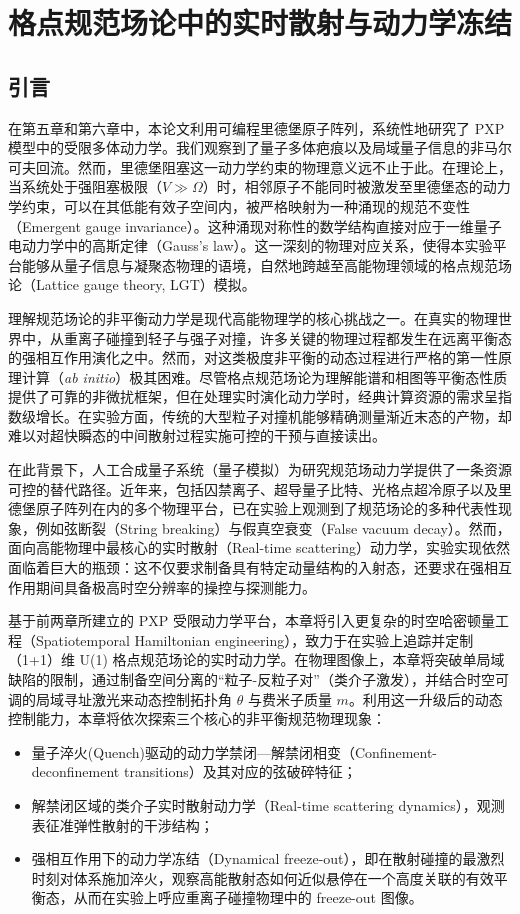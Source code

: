 \documentclass[../main.tex]{subfiles}
\begin{document}
\chapter{格点规范场论中的实时散射与动力学冻结}



\section{引言}

在第五章和第六章中，本论文利用可编程里德堡原子阵列，系统性地研究了 PXP 模型中的受限多体动力学。我们观察到了量子多体疤痕以及局域量子信息的非马尔可夫回流。然而，里德堡阻塞这一动力学约束的物理意义远不止于此。在理论上，当系统处于强阻塞极限（$V\gg\Omega$）时，相邻原子不能同时被激发至里德堡态的动力学约束，可以在其低能有效子空间内，被严格映射为一种涌现的规范不变性（Emergent gauge invariance）。这种涌现对称性的数学结构直接对应于一维量子电动力学中的高斯定律（Gauss's law）。这一深刻的物理对应关系，使得本实验平台能够从量子信息与凝聚态物理的语境，自然地跨越至高能物理领域的格点规范场论（Lattice gauge theory, LGT）模拟。

理解规范场论的非平衡动力学是现代高能物理学的核心挑战之一。在真实的物理世界中，从重离子碰撞到轻子与强子对撞，许多关键的物理过程都发生在远离平衡态的强相互作用演化之中。然而，对这类极度非平衡的动态过程进行严格的第一性原理计算（\textit{ab initio}）极其困难。尽管格点规范场论为理解能谱和相图等平衡态性质提供了可靠的非微扰框架，但在处理实时演化动力学时，经典计算资源的需求呈指数级增长。在实验方面，传统的大型粒子对撞机能够精确测量渐近末态的产物，却难以对超快瞬态的中间散射过程实施可控的干预与直接读出。

在此背景下，人工合成量子系统（量子模拟）为研究规范场动力学提供了一条资源可控的替代路径。近年来，包括囚禁离子、超导量子比特、光格点超冷原子以及里德堡原子阵列在内的多个物理平台，已在实验上观测到了规范场论的多种代表性现象，例如弦断裂（String breaking）与假真空衰变（False vacuum decay）。然而，面向高能物理中最核心的实时散射（Real-time scattering）动力学，实验实现依然面临着巨大的瓶颈：这不仅要求制备具有特定动量结构的入射态，还要求在强相互作用期间具备极高时空分辨率的操控与探测能力。

基于前两章所建立的 PXP 受限动力学平台，本章将引入更复杂的时空哈密顿量工程（Spatiotemporal Hamiltonian engineering），致力于在实验上追踪并定制（1+1）维 U(1) 格点规范场论的实时动力学。在物理图像上，本章将突破单局域缺陷的限制，通过制备空间分离的“粒子-反粒子对”（类介子激发），并结合时空可调的局域寻址激光来动态控制拓扑角 $\theta$ 与费米子质量 $m$。利用这一升级后的动态控制能力，本章将依次探索三个核心的非平衡规范物理现象：
\begin{itemize}
    \item 量子淬火(Quench)驱动的动力学禁闭—解禁闭相变（Confinement-deconfinement transitions）及其对应的弦破碎特征；
    \item 解禁闭区域的类介子实时散射动力学（Real-time scattering dynamics），观测表征准弹性散射的干涉结构；
    \item 强相互作用下的动力学冻结（Dynamical freeze-out），即在散射碰撞的最激烈时刻对体系施加淬火，观察高能散射态如何近似悬停在一个高度关联的有效平衡态，从而在实验上呼应重离子碰撞物理中的 freeze-out 图像。
\end{itemize}
\end{document}
